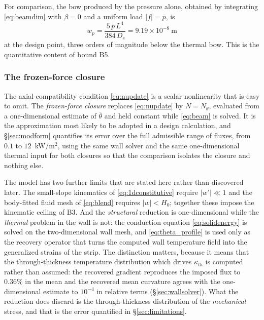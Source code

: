 \documentclass[11pt,a4paper]{article}
\begin{document}
For comparison, the bow produced by the pressure alone, obtained by
integrating \eqref{eq:beamdim} with $\beta=0$ and a uniform load
$|f|=\bar p$, is
\begin{equation}
w_p=\frac{5\,\bar p\,L^4}{384\,D_s}=9.19\times10^{-8}\ \mathrm{m}
\label{eq:pressurebow}
\end{equation}
at the design point, three orders of magnitude below the thermal bow. This is
the quantitative content of bound B5.

\subsubsection{The frozen-force closure}
\label{sec:frozen}

The axial-compatibility condition \eqref{eq:nupdate} is a scalar nonlinearity
that is easy to omit. The \emph{frozen-force closure} replaces
\eqref{eq:nupdate} by $N=N_\theta$, evaluated from a one-dimensional estimate
of $\bar\theta$ and held constant while \eqref{eq:beam} is solved. It is the
approximation most likely to be adopted in a design calculation, and
\S\ref{sec:modform} quantifies its error over the full admissible range of
fluxes, from $0.1$ to $12$~kW/m$^2$, using the same wall solver and the same
one-dimensional thermal input for both closures so that the comparison
isolates the closure and nothing else.

The model has two further limits that are stated here rather than discovered
later. The small-slope kinematics of \eqref{eq:1dconstitutive} require
$|w'|\ll1$ and the body-fitted fluid mesh of \eqref{eq:blend} requires
$|w|<H_0$; together these impose the kinematic ceiling of B3. And the
\emph{structural} reduction is one-dimensional while the \emph{thermal}
problem in the wall is not: the conduction equation \eqref{eq:solidenergy} is
solved on the two-dimensional wall mesh, and \eqref{eq:theta_profile} is used
only as the recovery operator that turns the computed wall temperature field
into the generalized strains of the strip. The distinction matters, because it
means that the through-thickness temperature distribution which drives
$\kappa_{th}$ is computed rather than assumed: the recovered gradient
reproduces the imposed flux to $0.36\%$ in the mean and the recovered mean
curvature agrees with the one-dimensional estimate to $10^{-4}$ in relative
terms (\S\ref{sec:wallsolver}). What the reduction does discard is the
through-thickness distribution of the \emph{mechanical} stress, and that is
the error quantified in \S\ref{sec:limitations}.
\end{document}
